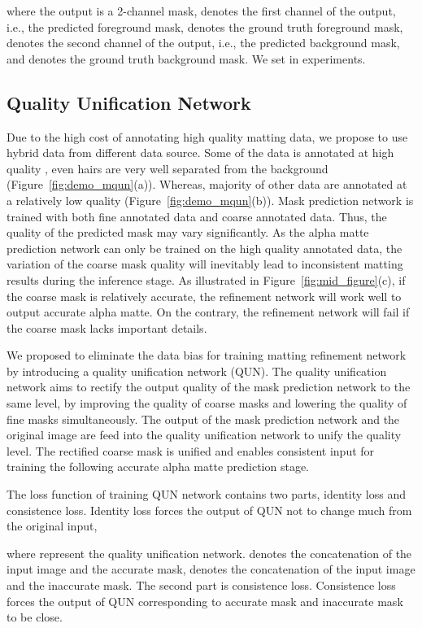 \documentclass[10pt,twocolumn,letterpaper]{article}
\begin{document}
where the output is a 2-channel mask,  denotes the first channel of the output, i.e., the predicted foreground mask,  denotes the ground truth foreground mask,  denotes the second channel of the output, i.e., the predicted background mask, and  denotes the ground truth background mask. We set  in experiments.


\subsection{Quality Unification Network}
Due to the high cost of annotating high quality matting data, we propose to use hybrid data from different data source. Some of the data is annotated at high quality , even hairs are very well separated from the background (Figure~\ref{fig:demo_mqun}(a)). Whereas, majority of other data are annotated at a relatively low quality (Figure~\ref{fig:demo_mqun}(b)). Mask prediction network is trained with both fine annotated data and coarse annotated data. Thus, the quality of the predicted mask may vary significantly. As the alpha matte prediction network can only be trained on the high quality annotated data, the variation of the coarse mask quality will inevitably lead to inconsistent matting results during the inference stage. As illustrated in Figure~\ref{fig:mid_figure}(c), if the coarse mask is relatively accurate, the refinement network will work well to output accurate alpha matte. On the contrary, the refinement network will fail if the coarse mask lacks important details.

We proposed to eliminate the data bias for training matting refinement network by introducing a quality unification network (QUN). The quality unification network aims to rectify the output quality of the mask prediction network to the same level, by improving the quality of coarse masks and lowering the quality of fine masks simultaneously. The output of the mask prediction network and the original image are feed into the quality unification network to unify the quality level. The rectified coarse mask is unified and enables consistent input for training the following accurate alpha matte prediction stage.

The loss function of training QUN network contains two parts, identity loss and consistence loss. Identity loss forces the output of QUN not to change much from the original input,

where  represent the quality unification network.  denotes the concatenation of the input image and the accurate mask,  denotes the concatenation of the input image and the inaccurate mask. The second part is consistence loss. Consistence loss forces the output of QUN corresponding to accurate mask and inaccurate mask to be close.
\end{document}
